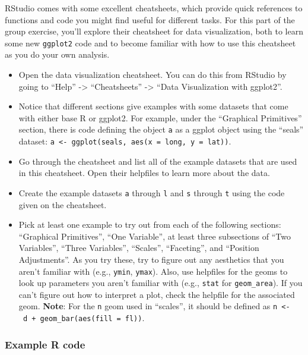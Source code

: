 \documentclass[]{book}
\providecommand{\tightlist}{%
  \setlength{\itemsep}{0pt}\setlength{\parskip}{0pt}}
\theoremstyle{definition}
\theoremstyle{definition}
\theoremstyle{definition}
\theoremstyle{remark}
\begin{document}
RStudio comes with some excellent cheatsheets, which provide quick
references to functions and code you might find useful for different
tasks. For this part of the group exercise, you'll explore their
cheatsheet for data visualization, both to learn some new
\texttt{ggplot2} code and to become familiar with how to use this
cheatsheet as you do your own analysis.

\begin{itemize}
\tightlist
\item
  Open the data visualization cheatsheet. You can do this from RStudio
  by going to ``Help'' -\textgreater{} ``Cheatsheets'' -\textgreater{}
  ``Data Visualization with ggplot2''.
\item
  Notice that different sections give examples with some datasets that
  come with either base R or ggplot2. For example, under the ``Graphical
  Primitives'' section, there is code defining the object \texttt{a} as
  a ggplot object using the ``seals'' dataset:
  \texttt{a\ \textless{}-\ ggplot(seals,\ aes(x\ =\ long,\ y\ =\ lat))}.
\item
  Go through the cheatsheet and list all of the example datasets that
  are used in this cheatsheet. Open their helpfiles to learn more about
  the data.
\item
  Create the example datasets \texttt{a} through \texttt{l} and
  \texttt{s} through \texttt{t} using the code given on the cheatsheet.
\item
  Pick at least one example to try out from each of the following
  sections: ``Graphical Primitives'', ``One Variable'', at least three
  subsections of ``Two Variables'', ``Three Variables'', ``Scales'',
  ``Faceting'', and ``Position Adjustments''. As you try these, try to
  figure out any aesthetics that you aren't familiar with (e.g.,
  \texttt{ymin}, \texttt{ymax}). Also, use helpfiles for the geoms to
  look up parameters you aren't familiar with (e.g., \texttt{stat} for
  \texttt{geom\_area}). If you can't figure out how to interpret a plot,
  check the helpfile for the associated geom. \textbf{Note}: For the
  \texttt{n} geom used in ``scales'', it should be defined as
  \texttt{n\ \textless{}-\ d\ +\ geom\_bar(aes(fill\ =\ fl))}.
\end{itemize}

\subsubsection{Example R code}\label{example-r-code-9}
\end{document}
